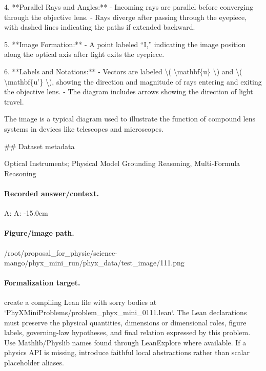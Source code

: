 4. **Parallel Rays and Angles:**
   - Incoming rays are parallel before converging through the objective lens.
   - Rays diverge after passing through the eyepiece, with dashed lines indicating the paths if extended backward.

5. **Image Formation:**
   - A point labeled “I,” indicating the image position along the optical axis after light exits the eyepiece.

6. **Labels and Notations:**
   - Vectors are labeled \textbackslash{}( \textbackslash{}mathbf\{u\} \textbackslash{}) and \textbackslash{}( \textbackslash{}mathbf\{u'\} \textbackslash{}), showing the direction and magnitude of rays entering and exiting the objective lens.
   - The diagram includes arrows showing the direction of light travel.

The image is a typical diagram used to illustrate the function of compound lens systems in devices like telescopes and microscopes.

\#\# Dataset metadata

Optical Instruments; Physical Model Grounding Reasoning, Multi-Formula Reasoning

\paragraph{Recorded answer/context.}
A: A: -15.0cm

\paragraph{Figure/image path.}
/root/proposal\_for\_physic/science-mango/phyx\_mini\_run/phyx\_data/test\_image/111.png

\paragraph{Formalization target.}
create a compiling Lean file with sorry bodies at `PhyXMiniProblems/problem\_phyx\_mini\_0111.lean`. The Lean declarations must preserve the physical quantities, dimensions or dimensional roles, figure labels, governing-law hypotheses, and final relation expressed by this problem.
Use Mathlib/Physlib names found through LeanExplore where available. If a physics API is missing, introduce faithful local abstractions rather than scalar placeholder aliases.

